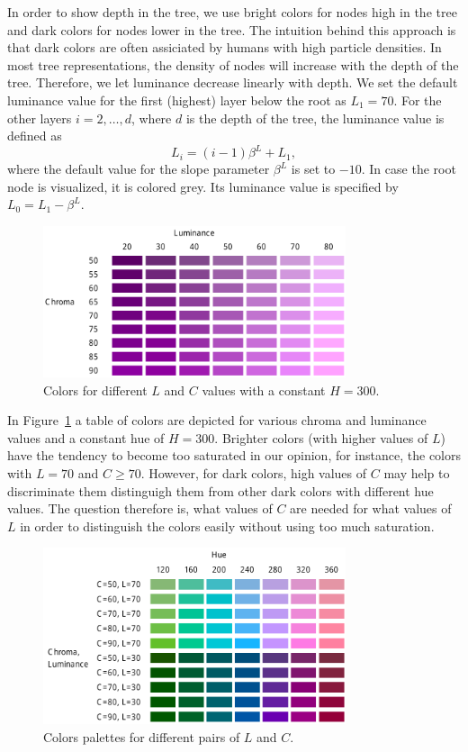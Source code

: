 \documentclass[journal]{vgtc}                %
\begin{document}
In order to show depth in the tree, we use bright colors for nodes high in the tree and dark colors for nodes lower in the tree. The intuition behind this approach is that dark colors are often assiciated by humans with high particle densities. In most tree representations, the density of nodes will increase with the depth of the tree. Therefore, we let luminance decrease linearly with depth.  We set the default luminance value for the first (highest) layer below the root as $L_1=70$. For the other layers $i=2,\ldots, d$, where $d$ is the depth of the tree, the luminance value is defined as
\begin{equation}
L_i=(i-1)\beta^L + L_1,
\end{equation}
where the default value for the slope parameter $\beta^L$ is set to $-10$. In case the root node is visualized, it is colored grey. Its luminance value is specified by $L_0=L_1-\beta^L$.

\begin{figure}[tb]
  \centering
  \includegraphics[width=3.5in]{LC.pdf}
  \caption{Colors for different $L$ and $C$ values with a constant $H=300$.}\label{fig:lc}
\end{figure}

In Figure~\ref{fig:lc} a table of colors are depicted for various chroma and luminance values and a constant hue of $H=300$. Brighter colors (with higher values of $L$) have the tendency to become too saturated in our opinion, for instance, the colors with $L=70$ and $C\geq70$. However, for dark colors, high values of $C$ may help to discriminate them distinguigh them from other dark colors with different hue values. The question therefore is, what values of $C$ are needed for what values of $L$ in order to distinguish the colors easily without using too much saturation.


\begin{figure}[tb]
  \centering
  \includegraphics[width=3.5in]{LC2.pdf}
  \caption{Colors palettes for different pairs of $L$ and $C$.}\label{fig:lc2}
\end{figure}
\end{document}
